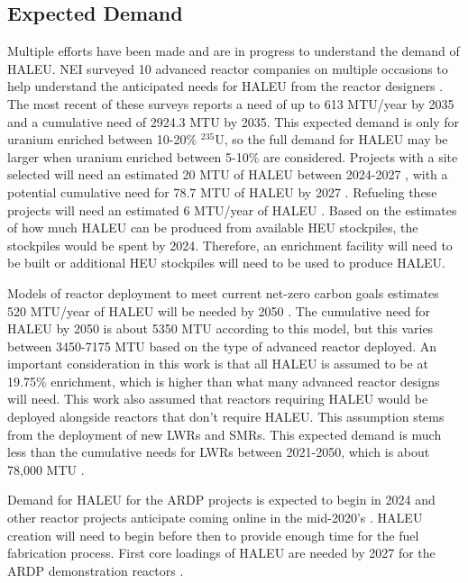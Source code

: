 \subsection{Expected Demand}
Multiple efforts have been made and are in progress to understand the 
demand of \gls{HALEU}. \gls{NEI} surveyed 10 advanced reactor 
companies on multiple occasions to help understand the anticipated needs
for \gls{HALEU} from the reactor designers 
\cite{korsnick_need_2018,korsnik_updated_2020,korsnick_updated_2021}. 
The most recent of these surveys \cite{korsnick_updated_2021} reports 
a need of up to 613 MTU/year by 2035 and a cumulative need of 2924.3 MTU 
by 2035. This expected demand is only for uranium enriched between 10-20\%
$^{235}$U, so the full demand for \gls{HALEU} may be larger when uranium 
enriched between 5-10\% are considered. Projects with a site selected 
will need an estimated 20 MTU of \gls{HALEU} between 2024-2027 
\cite{noauthor_establishing_2022}, with a potential cumulative 
need for 78.7 MTU of \gls{HALEU} by 2027 \cite{korsnick_updated_2021}. 
Refueling these projects will need an estimated 6 MTU/year of 
\gls{HALEU} \cite{noauthor_establishing_2022}. Based 
on the estimates of how much \gls{HALEU} can be produced from available 
\gls{HEU} stockpiles, the stockpiles would be spent by 2024. Therefore, 
an enrichment facility will need to be built or additional \gls{HEU} 
stockpiles will need to be used to produce \gls{HALEU}.

Models of reactor deployment to meet current net-zero carbon goals 
estimates 520 MTU/year of \gls{HALEU} 
will be needed by 2050 
\cite{dixon_estimated_2022}. The cumulative need for \gls{HALEU} by 2050 
is about 5350 MTU according to this model, but this varies between 
3450-7175 MTU based on the type of advanced reactor deployed. An important 
consideration in this work is that all \gls{HALEU} is assumed to be 
at 19.75\% enrichment, which is higher than what many advanced reactor 
designs will need. This work also assumed that reactors 
requiring \gls{HALEU} would be deployed alongside reactors that don't 
require \gls{HALEU}. This assumption stems from the deployment of new 
\glspl{LWR} and \glspl{SMR}. This expected demand is 
much less than the cumulative needs for \glspl{LWR} between 2021-2050, which 
is about 78,000 MTU \cite{dixon_estimated_2022}. 

Demand for \gls{HALEU} for the \gls{ARDP} projects is expected to begin in 
2024 and other reactor projects anticipate coming online in the 
mid-2020's \cite{noauthor_establishing_2022}. \gls{HALEU} creation will 
need to begin before then to provide enough time for the 
fuel fabrication process. First core loadings of \gls{HALEU} are needed by 
2027 for the \gls{ARDP} demonstration reactors \cite{dixon_estimated_2022}. 

